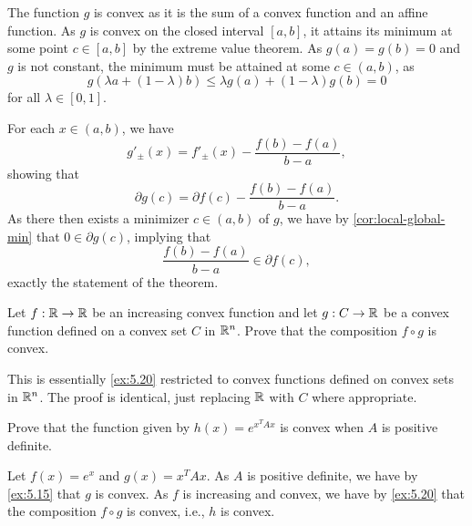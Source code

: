 \begin{solution}
  The function $g$ is convex as it is the sum of a convex function and an affine function.
  As $g$ is convex on the closed interval $[a, b]$, it attains its minimum at some point $c \in [a, b]$ by the extreme value theorem.
  As $g(a) = g(b) = 0$ and $g$ is not constant, the minimum must be attained at some $c \in (a, b)$, as
  \begin{equation}
    g(\lambda a + (1 - \lambda) b) \leq \lambda g(a) + (1 - \lambda) g(b) = 0
  \end{equation}
  for all $\lambda \in [0, 1]$.

  For each $x \in (a, b)$, we have
  \begin{equation}
    g'_{\pm}(x) = f'_{\pm}(x) - \frac{f(b) - f(a)}{b - a},
  \end{equation}
  showing that
  \begin{equation}
    \partial g(c) = \partial f(c) - \frac{f(b) - f(a)}{b - a}.
  \end{equation}
  As there then exists a minimizer $c \in (a, b)$ of $g$, we have by \cref{cor:local-global-min} that $0 \in \partial g(c)$, implying that
  \begin{equation}
    \frac{f(b) - f(a)}{b - a} \in \partial f(c),
  \end{equation}
  exactly the statement of the theorem.
\end{solution}

\begin{exercise}
  Let $f : \mathbb{R} \to \mathbb{R}$ be an increasing convex function and let $g : C \to \mathbb{R}$ be a convex function defined on a convex set $C$ in $\mathbb{R}^n$.
  Prove that the composition $f \circ g$ is convex.
\end{exercise}

\begin{solution}
  This is essentially \cref{ex:5.20} restricted to convex functions defined on convex sets in $\mathbb{R}^n$.
  The proof is identical, just replacing $\mathbb{R}$ with $C$ where appropriate.
\end{solution}

\begin{exercise}
  Prove that the function given by $h(x) = e^{x^T A x}$ is convex when $A$ is positive definite.
\end{exercise}

\begin{solution}
  Let $f(x) = e^x$ and $g(x) = x^T A x$.
  As $A$ is positive definite, we have by \cref{ex:5.15} that $g$ is convex.
  As $f$ is increasing and convex, we have by \cref{ex:5.20} that the composition $f \circ g$ is convex, i.e., $h$ is convex.
\end{solution}

